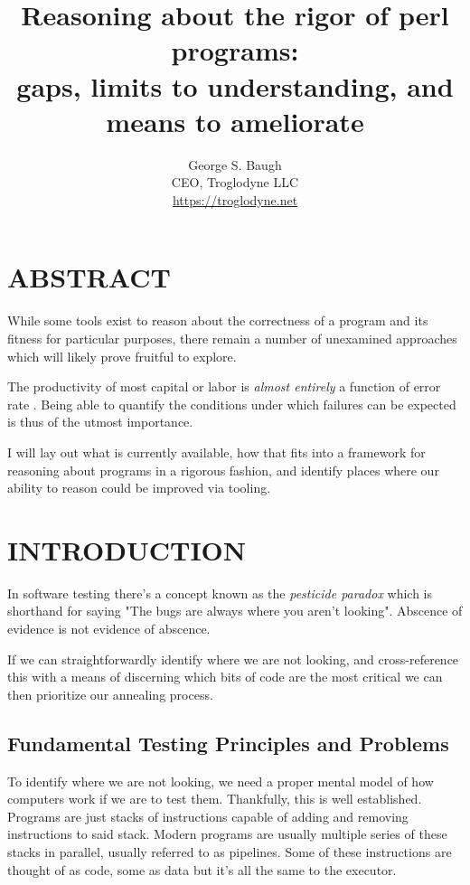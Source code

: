 \documentclass{article}
\title{%
    Reasoning about the rigor of perl programs: \\
    \large gaps, limits to understanding, and means to ameliorate
}
\author{%
    George S. Baugh \\
    \large CEO, Troglodyne LLC \\
    \url{https://troglodyne.net}
}
\begin{document}
\maketitle

\section{ABSTRACT}

While some tools exist to reason about the correctness of a program and its fitness for particular purposes,
there remain a number of unexamined approaches which will likely prove fruitful to explore.

The productivity of most capital or labor is \textit{almost entirely} a function of error rate \cite{oring}.
Being able to quantify the conditions under which failures can be expected is thus of the utmost importance.

I will lay out what is currently available, how that fits into a framework for reasoning about programs
in a rigorous fashion, and identify places where our ability to reason could be improved via tooling.

\newpage
\section{INTRODUCTION}

In software testing there's a concept known as the \textit{pesticide paradox} \cite{bezier} which is shorthand for saying
"The bugs are always where you aren't looking".  Abscence of evidence is not evidence of abscence.

If we can straightforwardly identify where we are not looking, and cross-reference this with
a means of discerning which bits of code are the most critical we can then prioritize our annealing process.

\subsection{Fundamental Testing Principles and Problems}

To identify where we are not looking, we need a proper mental model of how computers work if we are to test them.
Thankfully, this is well established.
Programs are just stacks of instructions capable of adding and removing instructions to said stack.
Modern programs are usually multiple series of these stacks in parallel, usually referred to as pipelines.
Some of these instructions are thought of as code, some as data but it's all the same to the executor.
\end{document}
